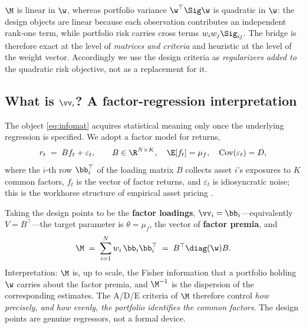 \begin{remark}
$\M$ is linear in $\w$, whereas portfolio variance $\w^\top\Sig\w$ is quadratic
in $\w$: the design objects are linear because each observation contributes an
independent rank-one term, while portfolio risk carries cross terms
$w_iw_j\Sig_{ij}$. The bridge is therefore exact at the level of \emph{matrices
and criteria} and heuristic at the level of the weight vector. Accordingly we use
the design criteria as \emph{regularizers added to} the quadratic risk objective,
not as a replacement for it.
\end{remark}

\subsection{What is $\vv_i$? A factor-regression interpretation}
\label{sec:vi}
The object \eqref{eq:infomat} acquires statistical meaning only once the
underlying regression is specified. We adopt a factor model for returns,
\begin{equation}
  r_t \;=\; B f_t + \varepsilon_t,
  \qquad B\in\R^{N\times K},\quad
  \E[f_t]=\mu_f,\quad \operatorname{Cov}(\varepsilon_t)=D,
  \label{eq:factor}
\end{equation}
where the $i$-th row $\bb_i^\top$ of the loading matrix $B$ collects asset $i$'s
exposures to $K$ common factors, $f_t$ is the vector of factor returns, and
$\varepsilon_t$ is idiosyncratic noise; this is the workhorse structure of
empirical asset pricing \cite{fama1993}.

Taking the design points to be the \textbf{factor loadings},
$\vv_i=\bb_i$---equivalently $V=B^\top$---the target parameter is
$\theta=\mu_f$, the vector of \textbf{factor premia}, and
\begin{equation}
  \M \;=\; \sum_{i=1}^{N} w_i\,\bb_i\bb_i^\top \;=\; B^\top\diag(\w)B .
  \label{eq:factorinfo}
\end{equation}
Interpretation: $\M$ is, up to scale, the Fisher information that a portfolio
holding $\w$ carries about the factor premia, and $\M^{-1}$ is the dispersion of
the corresponding estimates. The A/D/E criteria of $\M$ therefore control
\emph{how precisely, and how evenly, the portfolio identifies the common
factors}. The design points are genuine regressors, not a formal device.

